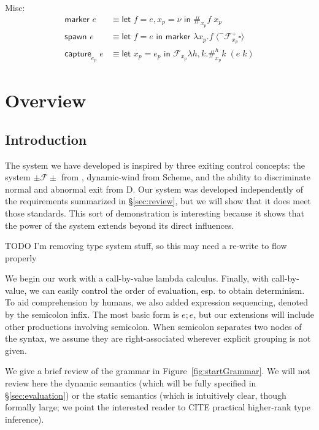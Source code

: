 \documentclass[11pt]{article}
\newcommand\x{\lambda x}
\newcommand{\letin}[2]{\textsf{let }#1\textsf{ in }#2}
\newcommand\F{\mathcal{F}}
\newcommand{\angles}[1]{\langle#1\rangle}
\begin{document}
Misc:
\begin{align*}
\textsf{marker }e &\equiv
	\letin{f=e, x_p=\nu}{\#_{x_p}f\;x_p}
	\\
\textsf{spawn }e &\equiv
	\letin{f=e}{\textsf{marker }\x_p.f\;\angles{^-\F^+_{x_p}\square}}
	\\
\textsf{capture}_{e_p}\;e &\equiv
	\letin{x_p=e_p}{\F_{x_p}\lambda h,k.\#_{x_p}^hk\;(e\;k)}
\end{align*}






\section{Overview}
\label{system-overview}

\subsection{Introduction}

The system we have developed is inspired by three exiting control concepts: the system $\pm\mathcal{F}\pm$ from \cite{MFDC}, dynamic-wind from Scheme, and the ability to discriminate normal and abnormal exit from D.
Our system was developed independently of the requirements summarized in \S\ref{sec:review}, but we will show that it does meet those standards.
This sort of demonstration is interesting because it shows that the power of the system extends beyond its direct influences.

TODO I'm removing type system stuff, so this may need a re-write to flow properly

We begin our work with a call-by-value lambda calculus.
Finally, with call-by-value, we can easily control the order of evaluation, esp. to obtain determinism.
To aid comprehension by humans, we also added expression sequencing, denoted by the semicolon infix.
The most basic form is $e; e$, but our extensions will include other productions involving semicolon.
When semicolon separates two nodes of the syntax, we assume they are right-associated wherever explicit grouping is not given.

We give a brief review of the grammar in Figure~\ref{fig:startGrammar}.
We will not review here the dynamic semantics (which will be fully specified in \S\ref{sec:evaluation}) or the static semantics (which is intuitively clear, though formally large; we point the interested reader to CITE practical higher-rank type inference).
\end{document}
